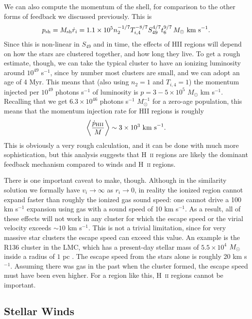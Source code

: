 We can also compute the momentum of the shell, for comparison to the other forms of feedback we discussed previously. This is
\begin{equation}
p_{\rm sh} = M_{\rm sh} \dot{r}_i = 1.1\times 10^5 n_2^{-1/7} T_{i,4}^{-8/7} S_{49}^{4/7} t_6^{9/7} \, M_\odot\mbox{ km s}^{-1}.
\end{equation}
Since this is non-linear in $S_{49}$ and in time, the effects of HII regions will depend on how the stars are clustered together, and how long they live. To get a rough estimate, though, we can take the typical cluster to have an ionizing luminosity around $10^{49}$ s$^{-1}$, since by number most clusters are small, and we can adopt an age of 4 Myr. This means that (also using $n_2 = 1$ and $T_{i,4} = 1$) the momentum injected per $10^{49}$ photons s$^{-1}$ of luminosity is $p = 3-5\times 10^5$ $M_\odot$ km s$^{-1}$. Recalling that we get $6.3\times 10^{46}$ photons s$^{-1}$ $M_\odot^{-1}$ for a zero-age population, this means that the momentum injection rate for HII regions is roughly
\begin{equation}
\left\langle\frac{\dot{p}_{\rm HII}}{M}\right\rangle \sim 3\times 10^3\mbox{ km s}^{-1}.
\end{equation}
This is obviously a very rough calculation, and it can be done with much more sophistication, but this analysis suggests that H~\textsc{ii} regions are likely the dominant feedback mechanism compared to winds and H~\textsc{ii} regions.

There is one important caveat to make, though. Although in the similarity solution we formally have $v_i \rightarrow \infty$ as $r_i \rightarrow 0$, in reality the ionized region cannot expand faster than roughly the ionized gas sound speed: one cannot drive a 100 km s$^{-1}$ expansion using gas with a sound speed of 10 km s$^{-1}$. As a result, all of these effects will not work in any cluster for which the escape speed or the virial velocity exceeds $\sim 10$ km s$^{-1}$. This is not a trivial limitation, since for very massive star clusters the escape speed can exceed this value. An example is the R136 cluster in the LMC, which has a present-day stellar mass of $5.5\times 10^4$ $M_{\odot}$ inside a radius of $1$ pc \citep{hunter96a}. The escape speed from the stars alone is roughly 20 km s$^{-1}$. Assuming there was gas in the past when the cluster formed, the escape speed must have been even higher. For a region like this, H~\textsc{ii} regions cannot be important.

\subsection{Stellar Winds}

